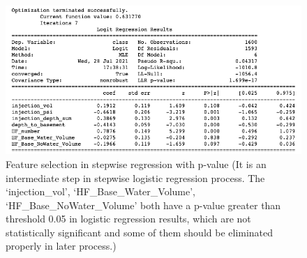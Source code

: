 \documentclass[final-report]{report-template}
\begin{document}
\begin{figure}[H]
    \begin{center}
        \includegraphics[width=1\textwidth]{p-value.png}
    \end{center}
    \caption{\label{fig:p-value} Feature selection in stepwise regression with p-value (It is an intermediate step in stepwise logistic regression process.
    The `injection\_vol', `HF\_Base\_Water\_Volume', `HF\_Base\_NoWater\_Volume' both have a p-value greater than threshold 0.05 in logistic regression results, which are not statistically significant and some of them should be eliminated properly in later process.)}
\end{figure}


\end{document}
